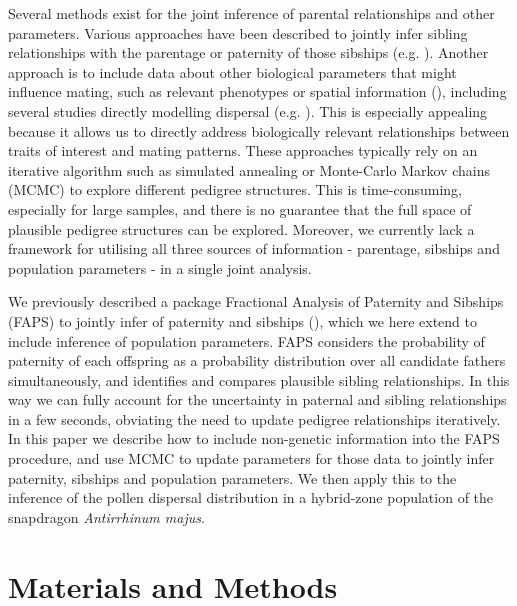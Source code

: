 \documentclass[10pt, a4paper, twocolumn]{article} %
\begin{document}
Several methods exist for the joint inference of parental relationships and other parameters.
Various approaches have been described to jointly infer sibling relationships with the parentage or paternity of those sibships (e.g. \cite{emery2001assignment, thomas2002sibship, jones2007estimating, wang2004sibship, anderson2016bayesian, huisman2017pedigree}).
Another approach is to include data about other biological parameters that might influence mating, such as relevant phenotypes or spatial information (\cite{neff2001bayesian, hadfield2006towards}), including several studies directly modelling dispersal (e.g. \textcite{adams1992using, smouse1999parentage, jones2003maximum, oddou2005pollen}).
This is especially appealing because it allows us to directly address biologically relevant relationships between traits of interest and mating patterns.
These approaches typically rely on an iterative algorithm such as simulated annealing or Monte-Carlo Markov chains (MCMC) to explore different pedigree structures.
This is time-consuming, especially for large samples, and there is no guarantee that the full space of plausible pedigree structures can be explored.
Moreover, we currently lack a framework for utilising all three sources of information - parentage, sibships and population parameters - in a single joint analysis.

We previously described a package Fractional Analysis of Paternity and Sibships (FAPS) to jointly infer of paternity and sibships (\cite{ellis2018efficient}), which we here extend to include inference of population parameters.
FAPS considers the probability of paternity of each offspring as a probability distribution over all candidate fathers simultaneously, and identifies and compares plausible sibling relationships.
In this way we can fully account for the uncertainty in paternal and sibling relationships in a few seconds, obviating the need to update pedigree relationships iteratively.
In this paper we describe how to include non-genetic information into the FAPS procedure, and use MCMC to update parameters for those data to jointly infer paternity, sibships and population parameters.
We then apply this to the inference of the pollen dispersal distribution in a hybrid-zone population of the snapdragon \textit{Antirrhinum majus}.


\section{Materials and Methods}
\end{document}

